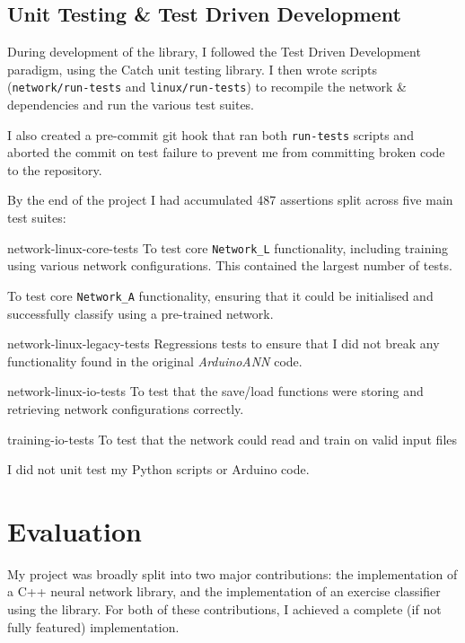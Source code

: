 \documentclass[a4paper]{article}
\begin{document}
\subsection{Unit Testing \& Test Driven Development}%
\label{subsec:pp_testing}

During development of the library, I followed the Test Driven Development paradigm, using the Catch\cite{ppref6} unit testing library. I then wrote scripts (\lstinline{network/run-tests} and \lstinline{linux/run-tests}) to recompile the network \& dependencies and run the various test suites. 

I also created a pre-commit git hook that ran both \lstinline{run-tests} scripts and aborted the commit on test failure to prevent me from committing broken code to the repository.

By the end of the project I had accumulated 487 assertions split across five main test suites:

\begin{description}
\item[network-linux-core-tests] To test core \lstinline{Network_L} functionality, including training using various network configurations. This contained the largest number of tests.
\item[network-arduino-core-tests] To test core \lstinline{Network_A} functionality, ensuring that it could be initialised and successfully classify using a pre-trained network.
\item[network-linux-legacy-tests] Regressions tests to ensure that I did not break any functionality found in the original \textit{ArduinoANN} code.
\item[network-linux-io-tests] To test that the save/load functions were storing and retrieving network configurations correctly.
\item{training-io-tests} To test that the network could read and train on valid input files
\end{description}

I did not unit test my Python scripts or Arduino code.

\newpage
\section{Evaluation}
\label{sec:ev}

My project was broadly split into two major contributions: the implementation of a C++ neural network library, and the implementation of an exercise classifier using the library. For both of these contributions, I achieved a complete (if not fully featured) implementation.
\end{document}
